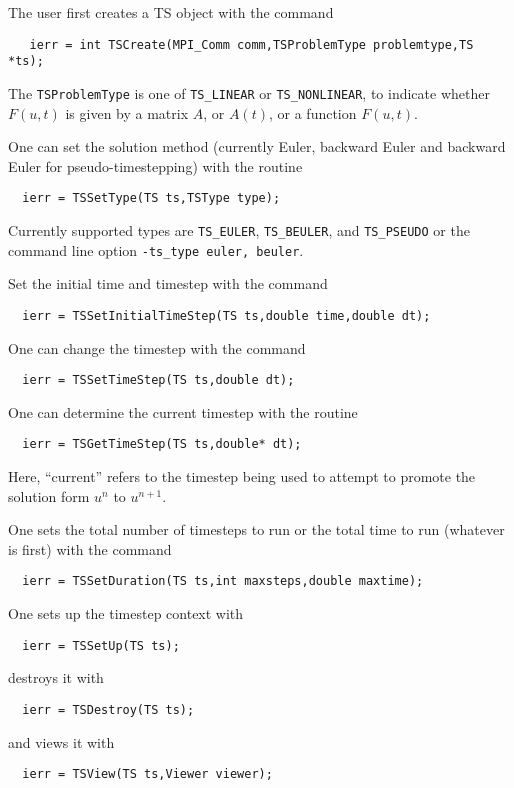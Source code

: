 The user first creates a TS object with the command
\begin{verbatim}
   ierr = int TSCreate(MPI_Comm comm,TSProblemType problemtype,TS *ts);
\end{verbatim}
 The {\tt TSProblemType} 
is one of {\tt TS\_LINEAR} or {\tt TS\_NONLINEAR},
to indicate whether $ F(u,t) $ is given by a matrix $ A$, or $ A(t) $, or a
function $ F(u,t).$

One can set the solution method (currently Euler, backward Euler
and backward Euler for pseudo-timestepping) with the routine
\begin{verbatim}
  ierr = TSSetType(TS ts,TSType type);
\end{verbatim}
 Currently supported types are {\tt TS\_EULER},
{\tt TS\_BEULER}, and {\tt TS\_PSEUDO}
  
or the command line option
{\tt -ts\_type euler, beuler}.  


Set the initial time and timestep with the command
\begin{verbatim}
  ierr = TSSetInitialTimeStep(TS ts,double time,double dt);
\end{verbatim}
One  can change the timestep with the command
\begin{verbatim}
  ierr = TSSetTimeStep(TS ts,double dt);
\end{verbatim}
One  
can  determine the current timestep with the routine
\begin{verbatim}
  ierr = TSGetTimeStep(TS ts,double* dt);
\end{verbatim}
Here, ``current'' refers to the timestep being used to attempt to
promote the solution form $ u^n $ to $ u^{n+1}$.

One sets the total number of timesteps to run or the total time to run 
(whatever is first) with the command 
\begin{verbatim}
  ierr = TSSetDuration(TS ts,int maxsteps,double maxtime);
\end{verbatim}
One sets up the timestep context with 
\begin{verbatim}
  ierr = TSSetUp(TS ts);
\end{verbatim}
destroys it with 
\begin{verbatim}
  ierr = TSDestroy(TS ts);
\end{verbatim}
and views it with 
\begin{verbatim}
  ierr = TSView(TS ts,Viewer viewer);
\end{verbatim}

